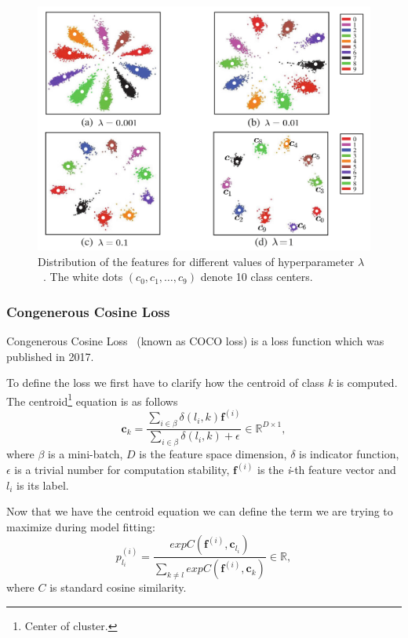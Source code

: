 \begin{figure}[H]
    \centering
    \includegraphics[width=\columnwidth]{images/face-recognition/centerlosslambda.png}
    \caption{Distribution of the features for different values of hyperparameter $\lambda$~\cite{CenterLoss}.
    The white dots $(c_0,c_1,\dots,c_9)$ denote 10 class centers.}
    \label{fig:centerlosslambda}
\end{figure}

\subsubsection{Congenerous Cosine Loss}\label{subsubsec:coco-loss}
Congenerous Cosine Loss~\cite{CocoLoss} (known as COCO loss) is a loss function which was published in 2017.

To define the loss we first have to clarify how the centroid of class \textit{k} is computed.
The centroid\footnote{Center of cluster.} equation is as follows
\begin{equation}
    \boldsymbol{c}_{k} = \frac{\sum_{i \in \beta} \delta \left( l_i, k \right)\boldsymbol{f}^{(i)}}
    {\sum_{i \in \beta} \delta \left( l_i, k \right) + \epsilon} \in \mathbb{R}^{D \times 1},
\end{equation}
where $\beta$ is a mini-batch, $D$ is the feature space dimension, $\delta$ is indicator function, $\epsilon$ is a
trivial number for computation stability, $\boldsymbol{f}^{(i)}$ is the \textit{i}-th feature vector and $l_i$ is
its label.

Now that we have the centroid equation we can define the term we are trying to maximize during model fitting:
\begin{equation}
    p_{l_i}^{(i)} = \frac{exp C(\boldsymbol{f}^{(i)}, \boldsymbol{c}_{l_{i}})}
    {\sum_{k \neq l} exp C(\boldsymbol{f}^{(i)}, \boldsymbol{c}_{k})} \in \mathbb{R},
\end{equation}
where $C$ is standard cosine similarity.

